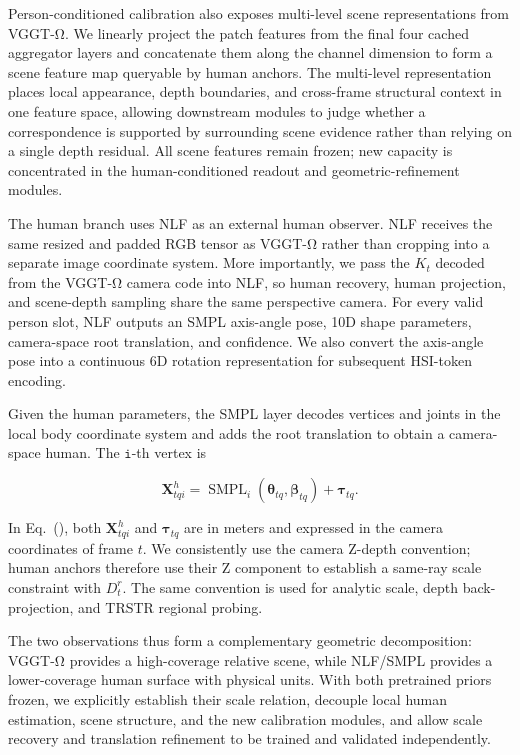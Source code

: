 \documentclass{article}
\begin{document}
Person-conditioned calibration also exposes multi-level scene representations from VGGT-Ω. We linearly project the patch features from the final four cached aggregator layers and concatenate them along the channel dimension to form a scene feature map queryable by human anchors. The multi-level representation places local appearance, depth boundaries, and cross-frame structural context in one feature space, allowing downstream modules to judge whether a correspondence is supported by surrounding scene evidence rather than relying on a single depth residual. All scene features remain frozen; new capacity is concentrated in the human-conditioned readout and geometric-refinement modules.

The human branch uses NLF as an external human observer. NLF receives the same resized and padded RGB tensor as VGGT-Ω rather than cropping into a separate image coordinate system. More importantly, we pass the $K_t$ decoded from the VGGT-Ω camera code into NLF, so human recovery, human projection, and scene-depth sampling share the same perspective camera. For every valid person slot, NLF outputs an SMPL axis-angle pose, 10D shape parameters, camera-space root translation, and confidence. We also convert the axis-angle pose into a continuous 6D rotation representation for subsequent HSI-token encoding.

Given the human parameters, the SMPL layer decodes vertices and joints in the local body coordinate system and adds the root translation to obtain a camera-space human. The $\texttt{i}$-th vertex is

\begin{equation}
\mathbf{X}_{tqi}^{h}
=\operatorname{SMPL}_{i}(\boldsymbol{\theta}_{tq},\boldsymbol{\beta}_{tq})
+\boldsymbol{\tau}_{tq}.
\label{eq:smpl-camera-vertices}
\end{equation}

In Eq.~(), both $\mathbf{X}_{tqi}^{h}$ and $\boldsymbol{\tau}_{tq}$ are in meters and expressed in the camera coordinates of frame $t$. We consistently use the camera Z-depth convention; human anchors therefore use their Z component to establish a same-ray scale constraint with $D_t^r$. The same convention is used for analytic scale, depth back-projection, and TRSTR regional probing.

The two observations thus form a complementary geometric decomposition: VGGT-Ω provides a high-coverage relative scene, while NLF/SMPL provides a lower-coverage human surface with physical units. With both pretrained priors frozen, we explicitly establish their scale relation, decouple local human estimation, scene structure, and the new calibration modules, and allow scale recovery and translation refinement to be trained and validated independently.
\end{document}
